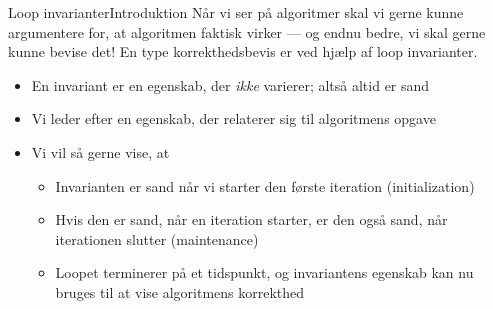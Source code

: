 \documentclass[aspectratio=1610]{beamer}
\begin{document}
\begin{frame}{Loop invarianter}{Introduktion}
    Når vi ser på algoritmer skal vi gerne kunne argumentere for, at algoritmen
    faktisk virker --- og endnu bedre, vi skal gerne kunne \alert{bevise} det!
    En type korrekthedsbevis er ved hjælp af \alert{loop invarianter}.

    \begin{itemize}[<+->]
        \item En \alert{invariant} er en egenskab, der \textit{ikke} varierer;
            altså altid er sand
        \item Vi leder efter en egenskab, der relaterer sig til algoritmens
            opgave
        \item Vi vil så gerne vise, at
            \begin{itemize}
                \item Invarianten er sand når vi starter den første iteration
                    (\alert{initialization})
                \item Hvis den er sand, når en iteration starter, er den også
                    sand, når iterationen slutter (\alert{maintenance})
                \item Loopet terminerer på et tidspunkt, og invariantens
                    egenskab kan nu bruges til at vise algoritmens korrekthed
            \end{itemize}
    \end{itemize}
\end{frame}
\end{document}
